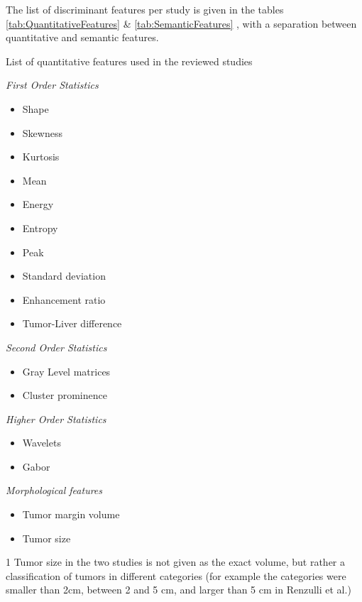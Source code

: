 \documentclass[]{article}
\begin{document}
The list of discriminant features per study is given in the tables \ref{tab:QuantitativeFeatures}
 \& \ref{tab:SemanticFeatures} , with a separation between quantitative and semantic features.

\begin{table}{}
\caption{List of quantitative features used in the reviewed studies}
\label{tab:QuantitativeFeatures}
\begin{threeparttable} 
\emph{First Order Statistics}
\begin{itemize}
\item Shape \cite{Cozzi2017}
\item Skewness \cite{Akai2018,Li2016,Zhou2017a}
\item Kurtosis \cite{Akai2018}
\item Mean \cite{Zhou2017a,Raman2015,Cozzi2017}
\item Energy \cite{Zhou2017a,Cozzi2017}
\item Entropy \cite{Peng2018,Akai2018}
\item Peak \cite{Bakr2017}
\item Standard deviation \cite{Xia2018}
\item Enhancement ratio \cite{Taouli2017}
\item Tumor-Liver difference \cite{Taouli2017}
\end{itemize}
\emph{Second Order Statistics} 
\begin{itemize}
\item Gray Level matrices \cite{Peng2018,Zheng2018,Cozzi2017}
\item Cluster prominence \cite{Xia2018}
\end{itemize}
\emph{Higher Order Statistics}
\begin{itemize}
\item Wavelets \cite{Chen2017,Li2016,Bakr2017}
\item Gabor \cite{Chen2017,Bakr2017}
\end{itemize}
\emph{Morphological features}
\begin{itemize}
\item Tumor margin volume \cite{Xia2018}
\item Tumor size \cite{Renzulli2016,Taouli2017}
\end{itemize}
\begin{tablenotes}
\item[1] {Tumor size in the two studies is not given as the exact volume, but
rather a classification of tumors in different categories (for example
the categories were smaller than 2cm, between 2 and 5 cm, and larger
than 5 cm in Renzulli et al.\cite{Renzulli2016})} 
\end{tablenotes}
\end{threeparttable}
\end{table}
\end{document}
